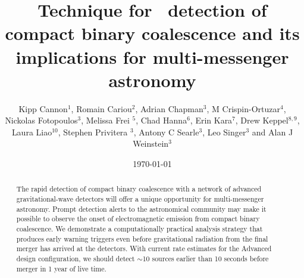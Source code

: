 \documentclass{iopart}
\begin{document}
\title[LLOID]{Technique for \earlywarning\ detection of compact binary
coalescence and its implications for multi-messenger astronomy}

\date{\today}

\author{Kipp Cannon$^{1}$, Romain Cariou$^{2}$, Adrian Chapman$^3$, M
Crispin-Ortuzar$^4$, Nickolas Fotopoulos$^3$, Melissa Frei $^5$, Chad
Hanna$^{6}$, Erin Kara$^{7}$, Drew Keppel$^{8,9}$, Laura Liao$^{10}$, Stephen
Privitera $^3$, Antony C Searle$^3$, Leo Singer$^3$ and Alan J  Weinstein$^3$}

\address{$^1$ Canadian Institute for Theoretical Astrophysics, Toronto, ON,
Canada}
\address{$^2$  D\'{e}partement de physique, \'{E}cole Normale Sup\'{e}rieure de Cachan, 61
Avenue du Pr\'{e}sident Wilson, 94235 Cachan Cedex, France}
\address{$^3$ LIGO Laboratory - California Institute of Technology, Pasadena,
CA, USA} 
\address{$^4$ Facultat de F\'{i}sica, Universitat de Val\`{e}ncia, E-46100 Burjassot,
Spain} 
\address{$^5$ The University of Texas at Austin, Austin, TX, USA}
\address{$^6$ Perimeter Institute for Theoretical Physics, Waterloo, ON,
Canada} 
\address{$^7$ Department of Physics and Astronomy, Barnard College, Columbia
University, New York, NY 10027, USA} 
\address{$^8$ Albert-Einstein-Institut, Max-Planck-Institut f\"{u}r
Gravitationphysik, Hannover, Germany} 
\address{$^9$ Leibniz Universit\"{a}t Hannover, Hannover, Germany}
\address{$^{10}$ Ryerson University, Toronto, ON, Canada}

\begin{abstract}
The rapid detection of compact binary coalescence with a network of advanced
gravitational-wave detectors will offer a unique opportunity for multi-messenger astronomy.  Prompt detection alerts to the astronomical community may make it possible to observe the onset of electromagnetic emission from compact binary coalescence.  We demonstrate a computationally practical analysis strategy that produces early warning triggers even before gravitational radiation from the final merger has arrived at the detectors.  With current rate estimates for the Advanced \LIGO{} design configuration, we should detect $\sim$10 sources earlier than 10 seconds before merger in 1 year of live time.
\end{abstract}

\end{document}
